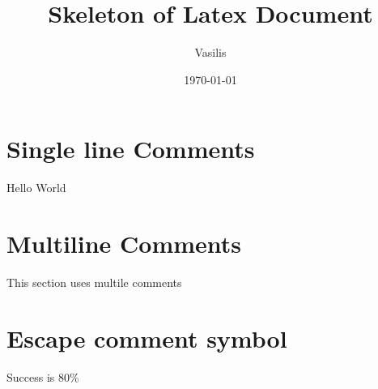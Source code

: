 \documentclass{article}
\title{Skeleton of Latex Document}
\author{Vasilis}
\date{\today}
\begin{document}
\maketitle

\section{Single line Comments}
Hello World %

\section{Multiline Comments}
This section uses multile comments 

\section{Escape comment symbol}
Success is 80\%
\end{document}
